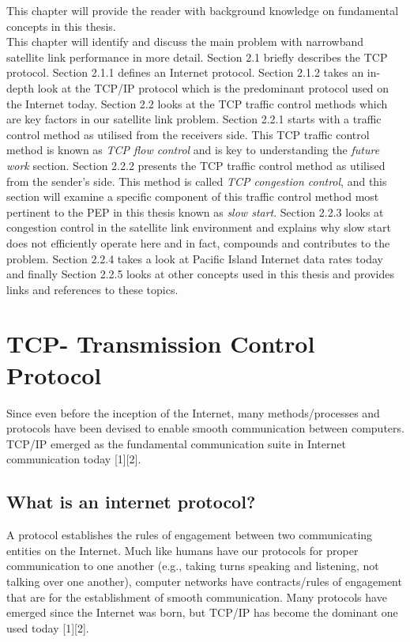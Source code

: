 \documentclass{uathesis}
\begin{document}
This chapter will provide the reader with background knowledge on fundamental concepts in this thesis.\\

This chapter will identify and discuss the main problem with narrowband satellite link performance in more detail. Section 2.1 briefly describes the TCP protocol. Section 2.1.1 defines an Internet protocol. Section 2.1.2 takes an in-depth look at the TCP/IP protocol which is the predominant protocol used on the Internet today. Section 2.2 looks at the TCP traffic control methods which are key factors in our satellite link problem. Section 2.2.1 starts with a traffic control method as utilised from the receivers side. This TCP traffic control method is known as \emph{TCP flow control} and is key to understanding the \emph{future work} section. Section 2.2.2 presents the TCP traffic control method as utilised from the sender's side. This method is called \emph{TCP congestion control}, and this section will examine a specific component of this traffic control method most pertinent to the PEP in this thesis known as \emph{slow start}. Section 2.2.3 looks at congestion control in the satellite link environment and explains why slow start does not efficiently operate here and in fact, compounds and contributes to the problem. Section 2.2.4 takes a look at Pacific Island Internet data rates today and finally Section 2.2.5 looks at other concepts used in this thesis and provides links and references to these topics.

\section{TCP- Transmission Control Protocol}
Since even before the inception of the Internet, many methods/processes and protocols have been devised to enable smooth communication between computers.  TCP/IP emerged as the fundamental communication suite in Internet communication today [1][2].\\

\subsection{What is an internet protocol?}
A protocol establishes the rules of engagement between two communicating entities on the Internet. Much like humans have our protocols for proper communication to one another (e.g., taking turns speaking and listening, not talking over one another), computer networks have contracts/rules of engagement that are for the establishment of smooth communication. Many protocols have emerged since the Internet was born, but TCP/IP has become the dominant one used today [1][2].
\end{document}
